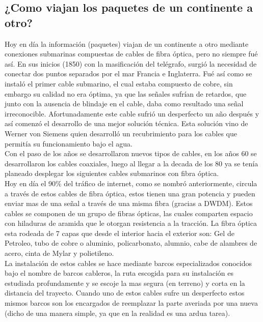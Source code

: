 \documentclass[a4paper]{article}
\begin{document}
\subsection{¿Como viajan los paquetes de un continente a otro?}
Hoy en día la información (paquetes) viajan de un continente a otro mediante conexiones submarinas compuestas de cables de fibra óptica, pero no siempre fué así. En sus inicios (1850) con la masificación del telégrafo, surgió la necesidad de conectar dos puntos separados por el mar Francia e Inglaterra. Fué así como se instaló el primer cable submarino, el cual estaba compuesto de cobre, sin embargo su calidad no era óptima, ya que las señales sufrían de retardos, que junto con la ausencia de blindaje en el cable, daba como resultado una señal irreconocible. Afortunadamente este cable sufrió un desperfecto un año después y así comenzó el desarrollo de una mejor solución técnica. Esta solución vino de Werner von Siemens quien desarrolló un recubrimiento para los cables que permitía su funcionamiento bajo el agua.\\

Con el paso de los años se desarrollaron nuevos tipos de cables, en los años 60 se desarrollaron los cables coaxiales, luego al llegar a la decada de los 80 ya se tenía planeado desplegar los siguientes cables submarinos con fibra óptica.\\

Hoy en día el 90\% del tráfico de internet, como se nombró anteriormente, circula a través  de estos cables de fibra óptica, estos tienen una gran potencia y pueden enviar mas de una señal a través de una misma fibra (gracias a DWDM). Estos cables se componen de un grupo de fibras ópticas, las cuales comparten espacio con hiladuras de aramida que le otorgan resistencia a la tracción. La fibra óptica esta rodeada de 7 capas que desde el interior hacia el exterior son: Gel de Petroleo, tubo de cobre o aluminio, policarbonato, alumnio, cabe de alambres de acero, cinta de Mylar y polietileno.\\

La instalación de estos cables se hace mediante barcos especializados conocidos bajo el nombre de barcos cableros, la ruta escogida para su instalación es estudiada profundamente y se escoje la mas segura (en terreno) y corta en la distancia del trayecto. Cuando uno de estos cables sufre un desperfecto estos mismos barcos son los encargados de reemplazar la parte averiada por una nueva (dicho de una manera simple, ya que en la realidad es una ardua tarea).\\
\end{document}
